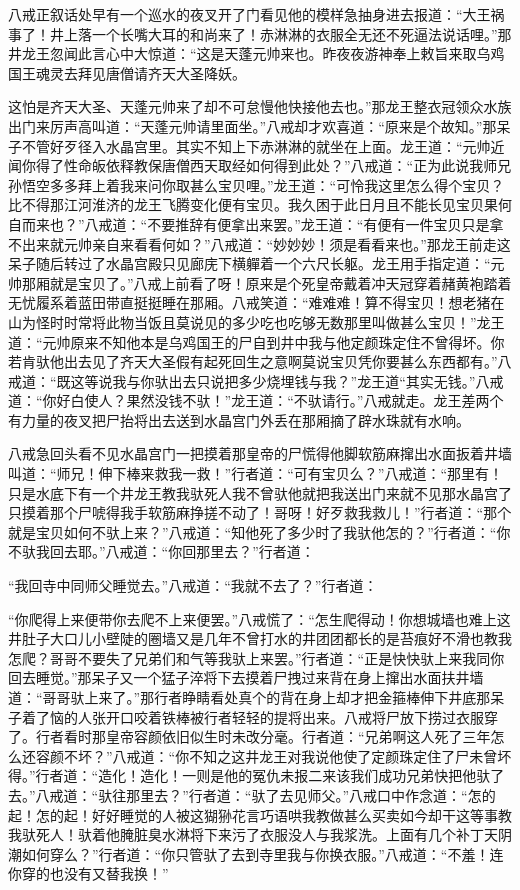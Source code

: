 \documentclass[12pt,UTF8]{ctexbook}
\begin{document}
八戒正叙话处早有一个巡水的夜叉开了门看见他的模样急抽身进去报道：“大王祸事了！井上落一个长嘴大耳的和尚来了！赤淋淋的衣服全无还不死逼法说话哩。”那井龙王忽闻此言心中大惊道：“这是天蓬元帅来也。昨夜夜游神奉上敕旨来取乌鸡国王魂灵去拜见唐僧请齐天大圣降妖。

这怕是齐天大圣、天蓬元帅来了却不可怠慢他快接他去也。”那龙王整衣冠领众水族出门来厉声高叫道：“天蓬元帅请里面坐。”八戒却才欢喜道：“原来是个故知。”那呆子不管好歹径入水晶宫里。其实不知上下赤淋淋的就坐在上面。龙王道：“元帅近闻你得了性命皈依释教保唐僧西天取经如何得到此处？”八戒道：“正为此说我师兄孙悟空多多拜上着我来问你取甚么宝贝哩。”龙王道：“可怜我这里怎么得个宝贝？比不得那江河淮济的龙王飞腾变化便有宝贝。我久困于此日月且不能长见宝贝果何自而来也？”八戒道：“不要推辞有便拿出来罢。”龙王道：“有便有一件宝贝只是拿不出来就元帅亲自来看看何如？”八戒道：“妙妙妙！须是看看来也。”那龙王前走这呆子随后转过了水晶宫殿只见廊庑下横軃着一个六尺长躯。龙王用手指定道：“元帅那厢就是宝贝了。”八戒上前看了呀！原来是个死皇帝戴着冲天冠穿着赭黄袍踏着无忧履系着蓝田带直挺挺睡在那厢。八戒笑道：“难难难！算不得宝贝！想老猪在山为怪时时常将此物当饭且莫说见的多少吃也吃够无数那里叫做甚么宝贝！”龙王道：“元帅原来不知他本是乌鸡国王的尸自到井中我与他定颜珠定住不曾得坏。你若肯驮他出去见了齐天大圣假有起死回生之意啊莫说宝贝凭你要甚么东西都有。”八戒道：“既这等说我与你驮出去只说把多少烧埋钱与我？”龙王道“其实无钱。”八戒道：“你好白使人？果然没钱不驮！”龙王道：“不驮请行。”八戒就走。龙王差两个有力量的夜叉把尸抬将出去送到水晶宫门外丢在那厢摘了辟水珠就有水响。

八戒急回头看不见水晶宫门一把摸着那皇帝的尸慌得他脚软筋麻撺出水面扳着井墙叫道：“师兄！伸下棒来救我一救！”行者道：“可有宝贝么？”八戒道：“那里有！只是水底下有一个井龙王教我驮死人我不曾驮他就把我送出门来就不见那水晶宫了只摸着那个尸唬得我手软筋麻挣搓不动了！哥呀！好歹救我救儿！”行者道：“那个就是宝贝如何不驮上来？”八戒道：“知他死了多少时了我驮他怎的？”行者道：“你不驮我回去耶。”八戒道：“你回那里去？”行者道：

“我回寺中同师父睡觉去。”八戒道：“我就不去了？”行者道：

“你爬得上来便带你去爬不上来便罢。”八戒慌了：“怎生爬得动！你想城墙也难上这井肚子大口儿小壁陡的圈墙又是几年不曾打水的井团团都长的是苔痕好不滑也教我怎爬？哥哥不要失了兄弟们和气等我驮上来罢。”行者道：“正是快快驮上来我同你回去睡觉。”那呆子又一个猛子淬将下去摸着尸拽过来背在身上撺出水面扶井墙道：“哥哥驮上来了。”那行者睁睛看处真个的背在身上却才把金箍棒伸下井底那呆子着了恼的人张开口咬着铁棒被行者轻轻的提将出来。八戒将尸放下捞过衣服穿了。行者看时那皇帝容颜依旧似生时未改分毫。行者道：“兄弟啊这人死了三年怎么还容颜不坏？”八戒道：“你不知之这井龙王对我说他使了定颜珠定住了尸未曾坏得。”行者道：“造化！造化！一则是他的冤仇未报二来该我们成功兄弟快把他驮了去。”八戒道：“驮往那里去？”行者道：“驮了去见师父。”八戒口中作念道：“怎的起！怎的起！好好睡觉的人被这猢狲花言巧语哄我教做甚么买卖如今却干这等事教我驮死人！驮着他腌脏臭水淋将下来污了衣服没人与我浆洗。上面有几个补丁天阴潮如何穿么？”行者道：“你只管驮了去到寺里我与你换衣服。”八戒道：“不羞！连你穿的也没有又替我换！”
\end{document}
